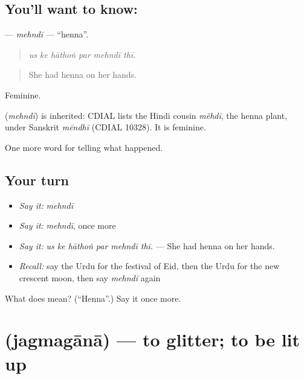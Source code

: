 \subsection*{You'll want to know: }
\textbf{} — \emph{mehndī} — \textquotedblleft{}henna\textquotedblright{}.

\begin{quote}
     
\end{quote}

\begin{quote}
\emph{us ke hāthoṅ par mehndī thī.}
\end{quote}

\begin{quote}
She had henna on her hands.
\end{quote}

Feminine.

\begin{cousinweb}
\textbf{} (\emph{mehndī}) is inherited: CDIAL lists the Hindi cousin \emph{mẽhdī}, the henna plant, under Sanskrit \emph{mēndhī} (CDIAL 10328). It is feminine.
\end{cousinweb}

\begin{grammarlens}[title={What you've built}]
One more word for telling what happened.
\end{grammarlens}

\subsection*{Your turn}
\begin{itemize}
\raggedright
  \item \emph{Say it:} \emph{mehndī}
  \item \emph{Say it:} \emph{mehndī}, once more
  \item \emph{Say it:} \emph{us ke hāthoṅ par mehndī thī.} — She had henna on her hands.
  \item \emph{Recall:} say the Urdu for the festival of Eid, then the Urdu for the new crescent moon, then say \emph{mehndī} again
\end{itemize}

\begin{tcolorbox}[breakable,colback=teal!4,colframe=teal!35!black,title={Before you move on}]
What does  mean? (\textquotedblleft{}Henna\textquotedblright{}.) Say it once more.
\end{tcolorbox}
\section[\texorpdfstring{\ur{جگمگانا} (jagmagānā)}{جگمگانا (jagmagānā)}]{ (jagmagānā) — to glitter; to be lit up}

